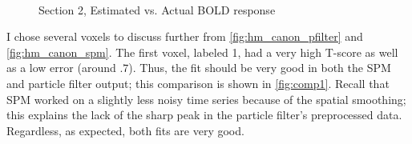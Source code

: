  
\begin{figure}
\\
\caption{Section 2, Estimated vs. Actual BOLD response}
\label{fig:comp2}
\end{figure}

I chose several voxels to discuss further from \autoref{fig:hm_canon_pfilter} and \autoref{fig:hm_canon_spm}.
The first voxel, labeled 1, had a very high T-score as well as a low error (around $.7$). Thus, the
fit should be very good in both the SPM and particle filter output; this comparison is shown in 
\autoref{fig:comp1}. Recall that SPM worked on a slightly less noisy time series because of the
spatial smoothing; this explains the lack of the sharp peak in the particle filter's preprocessed
data. Regardless, as expected, both fits are very good.

